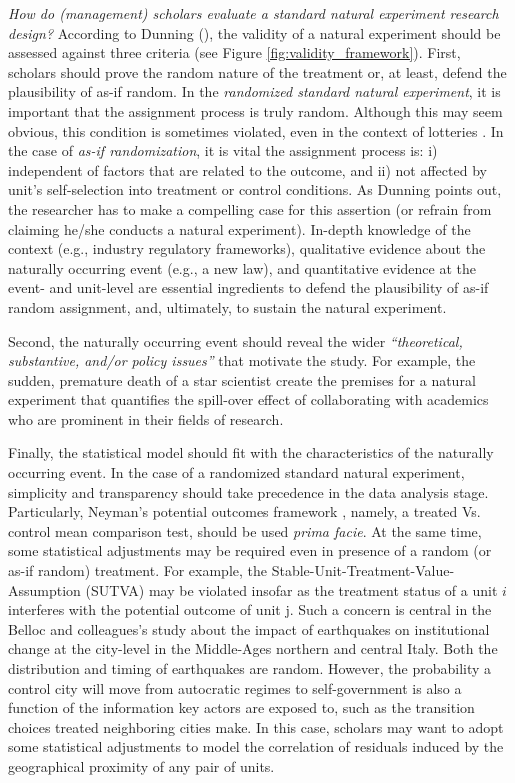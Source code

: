 \emph{How do (management) scholars evaluate a standard natural experiment research
design?} According to Dunning (\cite*[][page 27]{dunning2012}), the validity of
a natural experiment should be assessed against three criteria (see Figure
\ref{fig:validity_framework}).  First, scholars should prove the random
nature of the treatment or, at least, defend the plausibility of as-if random.
In the \emph{randomized standard natural experiment}, it is
important that the assignment process is truly random. Although this may seem
obvious, this condition is sometimes violated, even in the context of lotteries
\parencite[e.g.,][]{Starr1997}. In the case of \emph{as-if randomization}, it
is vital the assignment process is: i) independent of
factors that are related to the outcome, and ii) not affected by unit's
self-selection into treatment or control conditions. As Dunning points out, the
researcher has to make a compelling case for this assertion (or refrain from
claiming he/she conducts a natural experiment). In-depth knowledge of the context (e.g.,
industry regulatory frameworks), qualitative evidence about the naturally
occurring event (e.g., a new law), and quantitative evidence at the event- and
unit-level are essential ingredients to defend the plausibility of
as-if random assignment, and, ultimately, to sustain the natural experiment.

Second, the naturally occurring event should reveal the wider
\emph{``theoretical, substantive, and/or policy issues''} \parencite[][page
29]{Dunning2012} that motivate the study. For example, the sudden, premature
death of a star scientist \parencite[][]{Azoulay2010} create the premises for a
natural experiment that quantifies the spill-over effect of collaborating with
academics who are prominent in their fields of research.

Finally, the statistical model should fit with the characteristics of the
naturally occurring event. In the case of a randomized standard natural
experiment, simplicity and transparency should take precedence in the data
analysis stage. Particularly, Neyman's potential outcomes framework
\parencite[][]{Splawa1990}, namely, a treated Vs. control mean comparison test,
should be used \emph{prima facie}. At the same time, some statistical
adjustments may be required even in presence of a random (or as-if random)
treatment. For example, the Stable-Unit-Treatment-Value-Assumption (SUTVA) may
be violated insofar as the treatment status of a unit $i$ interferes with the
potential outcome of unit j. Such a concern is central in the Belloc and
colleagues's \parencite*[][]{Belloc2016} study about the impact of earthquakes
on institutional change at the city-level in the Middle-Ages northern and
central Italy. Both the distribution and timing of earthquakes are random.
However, the probability a control city will move from autocratic regimes to
self-government is also a function of the information key actors are exposed to,
such as the transition choices treated neighboring cities make. In this case,
scholars may want to adopt some statistical adjustments to model the correlation
of residuals induced by the geographical proximity of any pair of units.

